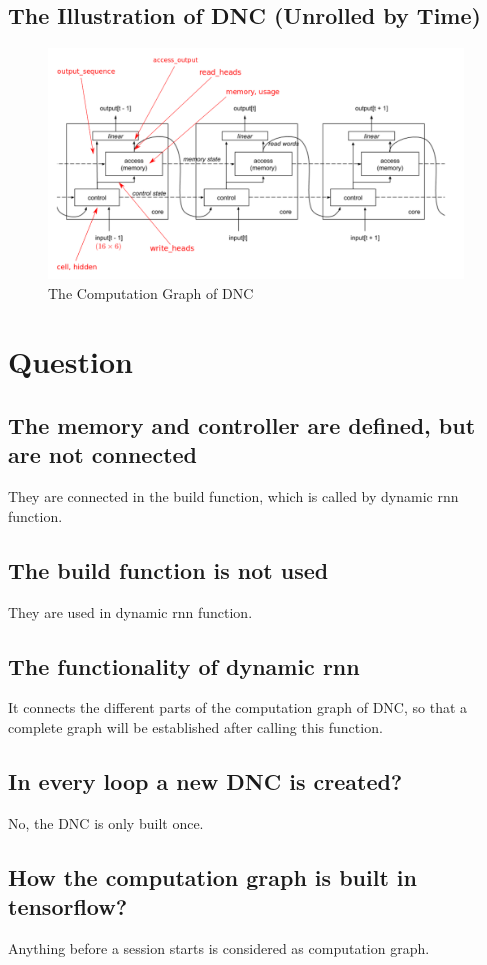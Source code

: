 \documentclass{article}
\begin{document}
\subsection{The Illustration of DNC (Unrolled by Time)}
\begin{figure}[!htb]
\centering
\includegraphics[width=0.98\textwidth]{dnc_model.pdf}
\caption{The Computation Graph of DNC}
\label{fig:DNC_ComputationGraph}
\end{figure}

\section{Question}
\subsection{The memory and controller are defined, but are not connected}
They are connected in the build function, which is called by dynamic rnn function.
\subsection{The build function is not used}
They are used in dynamic rnn function.
\subsection{The functionality of dynamic rnn}
It connects the different parts of the computation graph of DNC, so that a complete graph will be established after calling this function.
\subsection{In every loop a new DNC is created?}
No, the DNC is only built once. 
\subsection{How the computation graph is built in tensorflow?}
Anything before a session starts is considered as computation graph.
\end{document}
